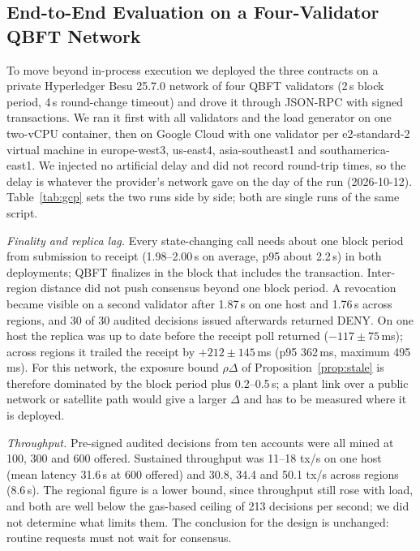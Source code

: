 \begin{table}[t]
\centering
\caption{Governance: testbed latency, quorum success and forced revocation}
\label{tab:governance}
\scriptsize

\par\smallskip{}
\end{table}

\subsection{End-to-End Evaluation on a Four-Validator QBFT Network}\label{sec:besu_eval}
To move beyond in-process execution we deployed the three contracts on a private Hyperledger Besu 25.7.0 network of four QBFT validators (2\,s block period, 4\,s round-change timeout) and drove it through JSON-RPC with signed transactions. We ran it first with all validators and the load generator on one two-vCPU container, then \label{sec:gcp_eval}on Google Cloud with one validator per e2-standard-2 virtual machine in europe-west3, us-east4, asia-southeast1 and southamerica-east1. We injected no artificial delay and did not record round-trip times, so the delay is whatever the provider's network gave on the day of the run (2026-10-12). Table~\ref{tab:gcp} sets the two runs side by side; both are single runs of the same script.

\emph{Finality and replica lag.} Every state-changing call needs about one block period from submission to receipt (1.98--2.00\,s on average, p95 about 2.2\,s) in both deployments; QBFT finalizes in the block that includes the transaction. Inter-region distance did not push consensus beyond one block period. A revocation became visible on a second validator after 1.87\,s on one host and 1.76\,s across regions, and 30 of 30 audited decisions issued afterwards returned DENY. On one host the replica was up to date before the receipt poll returned ($-117\pm75$\,ms); across regions it trailed the receipt by $+212\pm145$\,ms (p95 362\,ms, maximum 495\,ms). For this network, the exposure bound $\rho\Delta$ of Proposition~\ref{prop:stale} is therefore dominated by the block period plus 0.2--0.5\,s; a plant link over a public network or satellite path would give a larger $\Delta$ and has to be measured where it is deployed.

\emph{Throughput.} Pre-signed audited decisions from ten accounts were all mined at 100, 300 and 600 offered. Sustained throughput was 11--18 tx/s on one host (mean latency 31.6\,s at 600 offered) and 30.8, 34.4 and 50.1 tx/s across regions (8.6\,s). The regional figure is a lower bound, since throughput still rose with load, and both are well below the gas-based ceiling of 213 decisions per second; we did not determine what limits them. The conclusion for the design is unchanged: routine requests must not wait for consensus.

